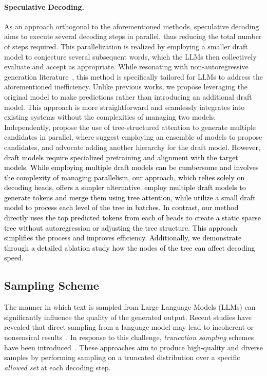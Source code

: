 \paragraph{Speculative Decoding.} As an approach orthogonal to the aforementioned methods, speculative decoding~\citep{leviathan2022fast,chen2023accelerating} aims to execute several decoding steps in parallel, thus reducing the total number of steps required. This parallelization is realized by employing a smaller draft model to conjecture several subsequent words, which the LLMs then collectively evaluate and accept as appropriate. While resonating with non-autoregressive generation literature~\citep{xiao2023survey}, this method is specifically tailored for LLMs to address the aforementioned inefficiency. Unlike previous works, we propose leveraging the original model to make predictions rather than introducing an additional draft model. This approach is more straightforward and seamlessly integrates into existing systems without the complexities of managing two models. Independently, \citet{miao2023specinfer, spector2023accelerating} propose the use of tree-structured attention to generate multiple candidates in parallel, where \citet{miao2023specinfer} suggest employing an ensemble of models to propose candidates, and \citet{spector2023accelerating} advocate adding another hierarchy for the draft model. 
\textcolor{black}{However, draft models require specialized pretraining and alignment with the target models. While employing multiple draft models can be cumbersome and involves the complexity of managing parallelism, our approach, which relies solely on decoding heads, offers a simpler alternative. \citet{miao2023specinfer} employ multiple draft models to generate tokens and merge them using tree attention, while \citet{spector2023accelerating} utilize a small draft model to process each level of the tree in batches. In contrast, our method directly uses the top predicted tokens from each of \ours heads to create a static sparse tree without autoregression or adjusting the tree structure. This approach simplifies the process and improves efficiency. Additionally, we demonstrate through a detailed ablation study how the nodes of the tree can affect decoding speed.}


\subsection{Sampling Scheme}
The manner in which text is sampled from Large Language Models (LLMs) can significantly influence the quality of the generated output. Recent studies have revealed that direct sampling from a language model may lead to incoherent or nonsensical results~\citep{pillutla2021mauve,holtzman2020curious}. In response to this challenge, \emph{truncation sampling} schemes have been introduced~\citep{fan2018hierarchical,basu2021mirostat,meister2022probability,hewitt2022truncation,meister2023locally}. These approaches aim to produce high-quality and diverse samples by performing sampling on a truncated distribution over a specific \emph{allowed set} at each decoding step.

